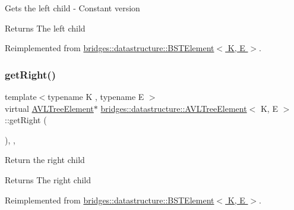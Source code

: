 Gets the left child -\/ Constant version

\begin{DoxyReturn}{Returns}
The left child 
\end{DoxyReturn}


Reimplemented from \hyperlink{classbridges_1_1datastructure_1_1_b_s_t_element_abac324ef0b480420bd82ecfe4501d60d}{bridges\+::datastructure\+::\+B\+S\+T\+Element$<$ K, E $>$}.

\mbox{\label{classbridges_1_1datastructure_1_1_a_v_l_tree_element_aed585fdf56fcbfebac6cd0262c9c1807}} 
\subsubsection{\texorpdfstring{get\+Right()}{getRight()}\hspace{0.1cm}{\footnotesize\ttfamily [1/2]}}
{\footnotesize\ttfamily template$<$typename K , typename E $>$ \\
virtual \hyperlink{classbridges_1_1datastructure_1_1_a_v_l_tree_element}{A\+V\+L\+Tree\+Element}$\ast$ \hyperlink{classbridges_1_1datastructure_1_1_a_v_l_tree_element}{bridges\+::datastructure\+::\+A\+V\+L\+Tree\+Element}$<$ K, E $>$\+::get\+Right (\begin{DoxyParamCaption}{ }\end{DoxyParamCaption})\hspace{0.3cm}{\ttfamily [inline]}, {\ttfamily [override]}, {\ttfamily [virtual]}}

Return the right child \begin{DoxyReturn}{Returns}
The right child 
\end{DoxyReturn}


Reimplemented from \hyperlink{classbridges_1_1datastructure_1_1_b_s_t_element_a80f5085d6d03805dd3091b7693d8e235}{bridges\+::datastructure\+::\+B\+S\+T\+Element$<$ K, E $>$}.

\mbox{\label{classbridges_1_1datastructure_1_1_a_v_l_tree_element_a5a2c4b96b51da1daa3c0426882250acb}} 
